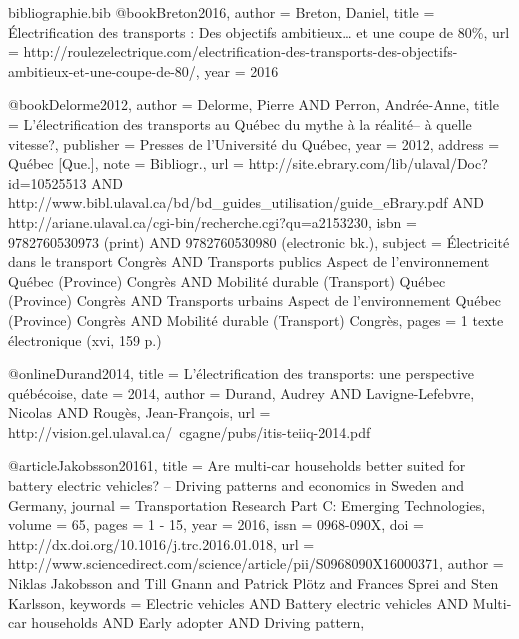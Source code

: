 
\begin{filecontents}{bibliographie.bib}
    @book{Breton2016,
        author = {Breton, Daniel},
        title  = {Électrification des transports : Des objectifs ambitieux… et une coupe de 80\%},
        url    = {http://roulezelectrique.com/electrification-des-transports-des-objectifs-ambitieux-et-une-coupe-de-80/},
        year   = {2016}
    }

    @book{Delorme2012,
        author    = {Delorme, Pierre AND Perron, Andrée-Anne},
        title     = {L'électrification des transports au Québec du mythe à la réalité-- à quelle vitesse?},
        publisher = {Presses de l'Université du Québec},
        year      = {2012},
        address   = {Québec [Que.]},
        note      = {Bibliogr.},
        url       = {http://site.ebrary.com/lib/ulaval/Doc?id=10525513 AND http://www.bibl.ulaval.ca/bd/bd\_guides\_utilisation/guide\_eBrary.pdf AND http://ariane.ulaval.ca/cgi-bin/recherche.cgi?qu=a2153230},
        isbn      = {9782760530973 (print) AND 9782760530980 (electronic bk.)},
        subject   = {Électricité dans le transport Congrès AND Transports publics Aspect de l'environnement Québec (Province) Congrès AND Mobilité durable (Transport) Québec (Province) Congrès AND Transports urbains Aspect de l'environnement Québec (Province) Congrès AND Mobilité durable (Transport) Congrès},
        pages     = {1 texte électronique (xvi, 159 p.)}
    }

    @online{Durand2014,
        title  = {L’électrification des transports: une perspective québécoise},
        date   = {2014},
        author = {Durand, Audrey AND Lavigne-Lefebvre, Nicolas AND Rougès, Jean-François},
        url    = {http://vision.gel.ulaval.ca/~cgagne/pubs/itis-teiiq-2014.pdf}
    }

    @article{Jakobsson20161,
        title    = {Are multi-car households better suited for battery electric vehicles? – Driving patterns and economics in Sweden and Germany},
        journal  = {Transportation Research Part C: Emerging Technologies},
        volume   = {65},
        pages    = {1 - 15},
        year     = {2016},
        issn     = {0968-090X},
        doi      = {http://dx.doi.org/10.1016/j.trc.2016.01.018},
        url      = {http://www.sciencedirect.com/science/article/pii/S0968090X16000371},
        author   = {Niklas Jakobsson and Till Gnann and Patrick Plötz and Frances Sprei and Sten Karlsson},
        keywords = {Electric vehicles AND Battery electric vehicles AND Multi-car households AND Early adopter AND Driving pattern},
    }


\end{filecontents}

